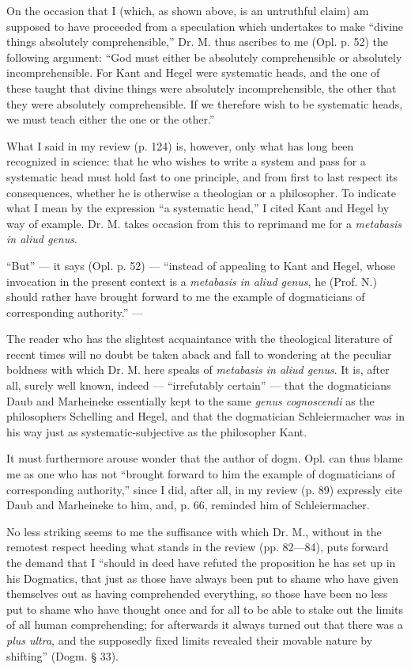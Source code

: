 \documentclass[12pt,a4paper,openany]{book}
\newcommand{\opage}[1]{\marginnote{\footnotesize\textit{[#1]}}}
\begin{document}
On the occasion that I (which, as shown above, is
an untruthful claim) am supposed to have proceeded from a speculation
which undertakes to make ``divine things
absolutely comprehensible,'' Dr. M. thus ascribes to me (Opl.
p. 52) the following argument: ``God must either be
absolutely comprehensible or absolutely incomprehensible. For Kant and
Hegel were systematic heads, and the one of these taught
that divine things were absolutely incomprehensible, the
other that they were absolutely comprehensible. If we therefore wish to be
systematic heads, we must teach either the one or
the other.''

What I said in my review (p. 124) is,
however, only what has long been recognized in science:
that he who wishes to write a system and pass for a systematic
head must hold fast to one principle, and from first to last
respect its consequences, whether he is otherwise
a theologian or a philosopher. To indicate what I mean
by the expression ``a systematic head,'' I cited Kant and Hegel
by way of example. Dr. M. takes occasion from this
to reprimand me for a \textit{metabasis in aliud genus}.

``But'' --- it says (Opl. p. 52) --- ``instead of
appealing to Kant and Hegel, whose invocation in the present
context is a \textit{metabasis in aliud genus},
\setcounter{footnote}{0}%
\opage{55}he (Prof. N.) should rather have brought forward to me the example of dogmaticians
of corresponding authority.'' ---

The reader who has the slightest acquaintance with the theological
literature of recent times will no doubt be taken aback and fall
to wondering at the peculiar boldness with which Dr.
M. here speaks of \textit{metabasis in aliud genus}. It is, after all,
surely well known, indeed --- ``irrefutably certain'' --- that the dogmaticians
Daub and Marheineke essentially kept to the same
\textit{genus cognoscendi} as the philosophers Schelling and Hegel,
and that the dogmatician Schleiermacher was in his way just as
systematic-subjective as the philosopher Kant.

It must furthermore arouse wonder that the author of
dogm. Opl. can thus blame me as one who has not
``brought forward to him the example of dogmaticians of corresponding authority,''
since I did, after all, in my review (p. 89) expressly
cite Daub and Marheineke to him, and, p. 66, reminded him
of Schleiermacher.

No less striking seems to me the suffisance
with which Dr. M., without in the remotest respect heeding
what stands in the review (pp. 82---84), puts forward the
demand that I ``should in deed have refuted the
proposition he has set up in his Dogmatics, that just as those
have always been put to shame who have given themselves out as
having comprehended everything, so those have been no less put
to shame who have thought once and for all to be able to stake out
the limits of all human comprehending; for afterwards
it always turned out that there was a \textit{plus ultra}, and the supposedly
fixed limits revealed their movable nature
by shifting'' (Dogm. § 33).
\end{document}
